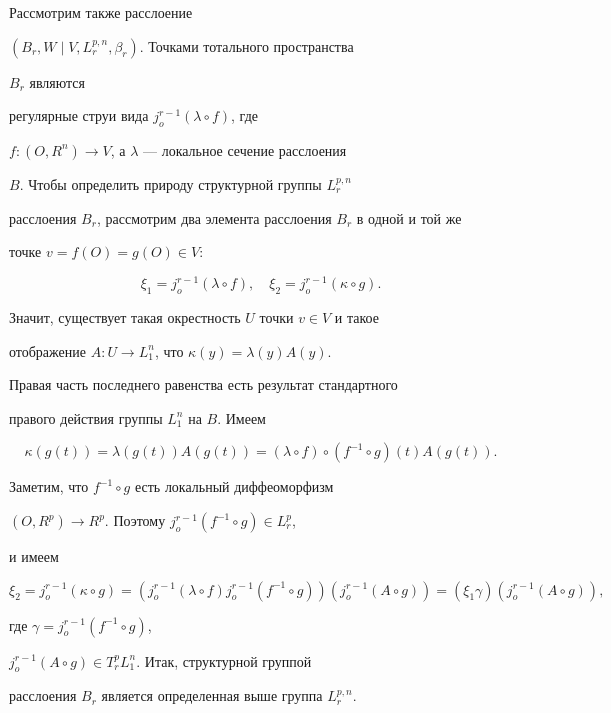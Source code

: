 Рассмотрим также расслоение


$(B_r, W \mid V, L^{p,n}_r, \beta_r)$. Точками тотального пространства


$B_r$ являются


регулярные струи вида $j^{r-1}_o (\lambda \circ f)$, где


$f: (O,R^n) \to V$, а $\lambda$ --- локальное сечение расслоения


$B$. Чтобы определить природу структурной группы $L^{p,n}_r$


расслоения $B_r$, рассмотрим два элемента расслоения $B_r$ в одной и той же


точке $v = f(O) = g(O) \in V$:


$$


\xi_1 = j^{r-1}_o (\lambda \circ f),\quad


\xi_2 = j^{r-1}_o (\kappa \circ g).


$$


Значит, существует такая окрестность $U$ точки $v \in V$ и такое


отображение $A: U \to L^n_1$, что $\kappa(y) = \lambda (y) A(y)$.


Правая часть последнего равенства есть результат стандартного


правого действия группы $L^n_1$ на $B$. Имеем


$$


\kappa (g(t)) = \lambda(g(t))A(g(t)) =


(\lambda \circ f) \circ (f^{-1} \circ g)(t)A(g(t)).


$$


Заметим, что $f^{-1} \circ g$ есть локальный диффеоморфизм


$(O,R^p) \to R^p$. Поэтому $j^{r-1}_o (f^{-1} \circ g) \in L^p_r$,


и имеем


$$


\xi_2 = j^{r-1}_o (\kappa \circ g) = (j^{r-1}_o (\lambda \circ f)


j^{r-1}_o (f^{-1} \circ g))(j^{r-1}_o (A \circ g)) =


(\xi_1 \gamma)(j^{r-1}_o (A \circ g)),


$$


где $\gamma = j^{r-1}_o (f^{-1} \circ g)$,


$j^{r-1}_o (A \circ g) \in T^p_r L^n_1$. Итак, структурной группой


расслоения $B_r$ является определенная выше группа $L^{p,n}_r$.





